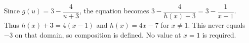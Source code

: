 Since $g(u)=3-\dfrac{4}{u+3}$, the equation becomes $3-\dfrac{4}{h(x)+3}=3-\dfrac{1}{x-1}$. Thus $h(x)+3=4(x-1)$ and $\boxed{h(x)=4x-7}$ for $x\ne1$. This never equals $-3$ on that domain, so composition is defined. No value at $x=1$ is required.
